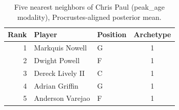 \begin{table}[htbp]
  \centering\small
  \begin{tabular}{rllc}
    \toprule
    Rank & Player & Position & Archetype \\
    \midrule
    1 & Markquis Nowell & G & 1 \\
    2 & Dwight Powell & F & 1 \\
    3 & Dereck Lively II & C & 1 \\
    4 & Adrian Griffin & G & 1 \\
    5 & Anderson Varejao & F & 1 \\
    \bottomrule
  \end{tabular}
  \caption{Five nearest neighbors of Chris Paul (peak_age modality), Procrustes-aligned posterior mean.}
  \label{tab:Chris_Paul_neighbors_peak_age}
\end{table}

